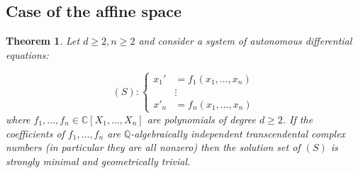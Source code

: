 \documentclass[12pt]{amsart}
\theoremstyle{definition}
\theoremstyle{plain}
\newtheorem{theorem}[definition]{Theorem}
\theoremstyle{exampstyle}
\theoremstyle{exampstyle}\newtheorem{thmxbis}{Theorem}
\numberwithin{equation}{section}
\theoremstyle{remark}
\begin{document}
\subsection{Case of the affine space} 


\begin{theorem} \label{theorem-affine-sm}
Let $d \geq 2, n \geq 2$ and consider a system of autonomous differential equations: 

$$(S): \begin{cases} 
x_1'& =  f_1(x_1,\ldots, x_n) \\
& \vdots  \\ 
x'_n & = f_n(x_1,\ldots, x_n) 
\end{cases}$$
where $f_1,\ldots, f_n \in \mathbb{C}[X_1,\ldots, X_n]$ are polynomials of degree $d \geq 2$. If the coefficients of $f_1,\ldots, f_n$ are  $\mathbb{Q}$-algebraically independent transcendental complex numbers (in particular they are all nonzero) then the solution set of $(S)$ is strongly minimal and geometrically trivial. 
\end{theorem} 
\end{document}
